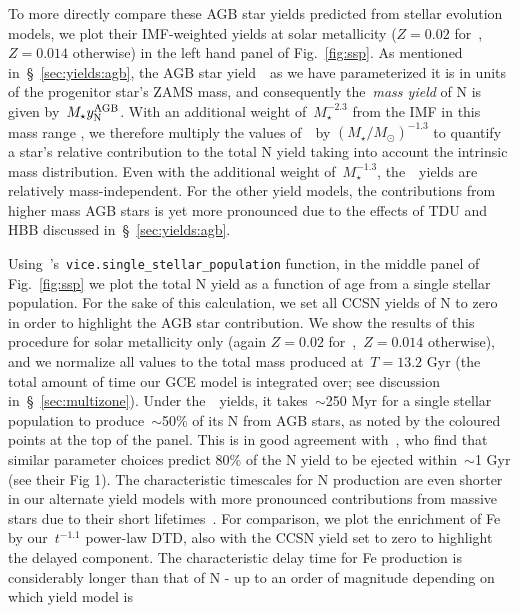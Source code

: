 \documentclass[ms.tex]{subfiles}
\begin{document}
To more directly compare these AGB star yields predicted from stellar
evolution models, we plot their IMF-weighted yields at solar metallicity
($Z = 0.02$ for~\karakasten, $Z = 0.014$ otherwise) in the left hand panel of
Fig.~\ref{fig:ssp}.
As mentioned in~\S~\ref{sec:yields:agb}, the AGB star yield~~as we
have parameterized it is in units of the progenitor star's ZAMS mass, and
consequently the~\textit{mass yield} of N is given by~$M_\star y_\text{N}^\text{AGB}$.
With an additional weight of~$M_\star^{-2.3}$ from the IMF in this mass range
\citep[e.g.][]{Kroupa2001}, we therefore multiply the values of~~by
$(M_\star / M_\odot)^{-1.3}$ to quantify a star's relative contribution to the
total N yield taking into account the intrinsic mass distribution.
Even with the additional weight of~$M_\star^{-1.3}$, the~\cristallo~yields are
relatively mass-independent.
For the other yield models, the contributions from higher mass AGB stars is
yet more pronounced due to the effects of TDU and HBB discussed
in~\S~\ref{sec:yields:agb}.
\par
Using~\vice's~\texttt{vice.single\_stellar\_population} function, in the
middle panel of Fig.~\ref{fig:ssp} we plot the total N yield as a function of
age from a single stellar population.
For the sake of this calculation, we set all CCSN yields of N to zero in order
to highlight the AGB star contribution.
We show the results of this procedure for solar metallicity only (again
$Z = 0.02$ for~\karakasten,~$Z = 0.014$ otherwise), and we normalize all values
to the total mass produced at~$T = 13.2$ Gyr (the total amount of time our GCE
model is integrated over; see discussion in~\S~\ref{sec:multizone}).
Under the~\cristallo~yields, it takes~$\sim$250 Myr for a single stellar
population to produce~$\sim$50\% of its N from AGB stars, as noted by the
coloured points at the top of the panel.
This is in good agreement with~\citet{Maiolino2019}, who find that similar
parameter choices predict 80\% of the N yield to be ejected within~$\sim$1 Gyr
(see their Fig 1).
The characteristic timescales for N production are even shorter in our alternate
yield models with more pronounced contributions from massive stars due to
their short lifetimes~\citep[e.g.][]{Larson1974, Maeder1989, Padovani1993}.
For comparison, we plot the enrichment of Fe by our~$t^{-1.1}$ power-law DTD,
also with the CCSN yield set to zero to highlight the delayed component.
The characteristic delay time for Fe production is considerably longer than
that of N - up to an order of magnitude depending on which yield model is
\end{document}
